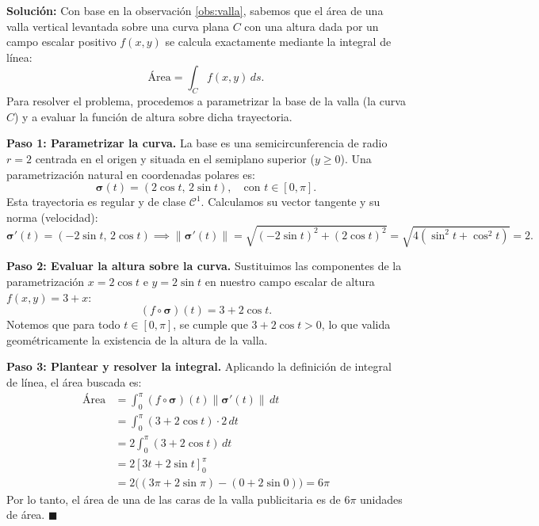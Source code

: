 \noindent\textbf{Solución:} Con base en la observación \ref{obs:valla}, sabemos que el área de una valla vertical levantada sobre una curva plana $C$ con una altura dada por un campo escalar positivo $f(x,y)$ se calcula exactamente mediante la integral de línea:
\[
\text{Área} = \int_{C} f(x,y) \, ds.
\]
Para resolver el problema, procedemos a parametrizar la base de la valla (la curva $C$) y a evaluar la función de altura sobre dicha trayectoria.

\noindent\textbf{Paso 1: Parametrizar la curva.} 
La base es una semicircunferencia de radio $r = 2$ centrada en el origen y situada en el semiplano superior ($y \ge 0$). Una parametrización natural en coordenadas polares es:
\[
\boldsymbol{\sigma}(t) = (2\cos t,\, 2\sin t), \quad \text{con } t \in [0, \pi].
\]
Esta trayectoria es regular y de clase $\mathcal{C}^1$. Calculamos su vector tangente y su norma (velocidad):
\[
\boldsymbol{\sigma}'(t) = (-2\sin t,\, 2\cos t) \implies \|\boldsymbol{\sigma}'(t)\| = \sqrt{(-2\sin t)^2 + (2\cos t)^2} = \sqrt{4(\sin^2 t + \cos^2 t)} = 2.
\]

\noindent\textbf{Paso 2: Evaluar la altura sobre la curva.}
Sustituimos las componentes de la parametrización $x = 2\cos t$ e $y = 2\sin t$ en nuestro campo escalar de altura $f(x,y) = 3 + x$:
\[
(f \circ \boldsymbol{\sigma})(t) = 3 + 2\cos t.
\]
Notemos que para todo $t \in [0, \pi]$, se cumple que $3 + 2\cos t > 0$, lo que valida geométricamente la existencia de la altura de la valla.

\noindent\textbf{Paso 3: Plantear y resolver la integral.}
Aplicando la definición de integral de línea, el área buscada es:
\begin{align*}
\text{Área} &= \int_{0}^{\pi} (f \circ \boldsymbol{\sigma})(t) \|\boldsymbol{\sigma}'(t)\| \, dt \\[0.2cm]
&= \int_{0}^{\pi} (3 + 2\cos t) \cdot 2 \, dt \\[0.2cm]
&= 2 \int_{0}^{\pi} (3 + 2\cos t) \, dt \\[0.2cm]
&= 2 \left[ 3t + 2\sin t \right]_{0}^{\pi} \\[0.2cm]
&= 2 \Big( (3\pi + 2\sin\pi) - (0 + 2\sin 0) \Big) = 6\pi
\end{align*}
Por lo tanto, el área de una de las caras de la valla publicitaria es de $6\pi$ unidades de área. \hfill $\blacksquare$











